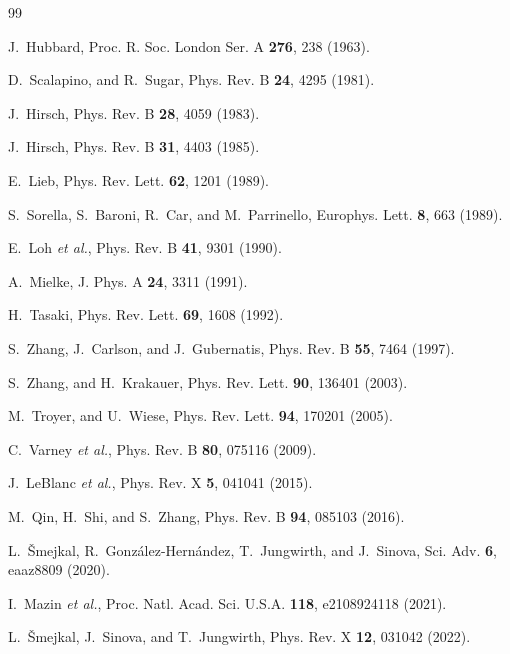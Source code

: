 \documentclass[aps,prb,reprint,superscriptaddress,amsmath,amssymb,floatfix]{revtex4-2}
\begin{document}
\begin{thebibliography}{99}


J.~Hubbard,
Proc. R. Soc. London Ser. A \textbf{276}, 238 (1963).

D.~Scalapino, and R.~Sugar,
Phys. Rev. B \textbf{24}, 4295 (1981).

J.~Hirsch,
Phys. Rev. B \textbf{28}, 4059 (1983).

J.~Hirsch,
Phys. Rev. B \textbf{31}, 4403 (1985).

E.~Lieb,
Phys. Rev. Lett. \textbf{62}, 1201 (1989).

S.~Sorella, S.~Baroni, R.~Car, and M.~Parrinello,
Europhys. Lett. \textbf{8}, 663 (1989).

E.~Loh \textit{et al.},
Phys. Rev. B \textbf{41}, 9301 (1990).

A.~Mielke,
J. Phys. A \textbf{24}, 3311 (1991).

H.~Tasaki,
Phys. Rev. Lett. \textbf{69}, 1608 (1992).

S.~Zhang, J.~Carlson, and J.~Gubernatis,
Phys. Rev. B \textbf{55}, 7464 (1997).

S.~Zhang, and H.~Krakauer,
Phys. Rev. Lett. \textbf{90}, 136401 (2003).

M.~Troyer, and U.~Wiese,
Phys. Rev. Lett. \textbf{94}, 170201 (2005).

C.~Varney \textit{et al.},
Phys. Rev. B \textbf{80}, 075116 (2009).

J.~LeBlanc \textit{et al.},
Phys. Rev. X \textbf{5}, 041041 (2015).

M.~Qin, H.~Shi, and S.~Zhang,
Phys. Rev. B \textbf{94}, 085103 (2016).

L.~Šmejkal, R.~González-Hernández, T.~Jungwirth, and J.~Sinova,
Sci. Adv. \textbf{6}, eaaz8809 (2020).

I.~Mazin \textit{et al.},
Proc. Natl. Acad. Sci. U.S.A. \textbf{118}, e2108924118 (2021).

L.~Šmejkal, J.~Sinova, and T.~Jungwirth,
Phys. Rev. X \textbf{12}, 031042 (2022).


\end{thebibliography}
\end{document}
